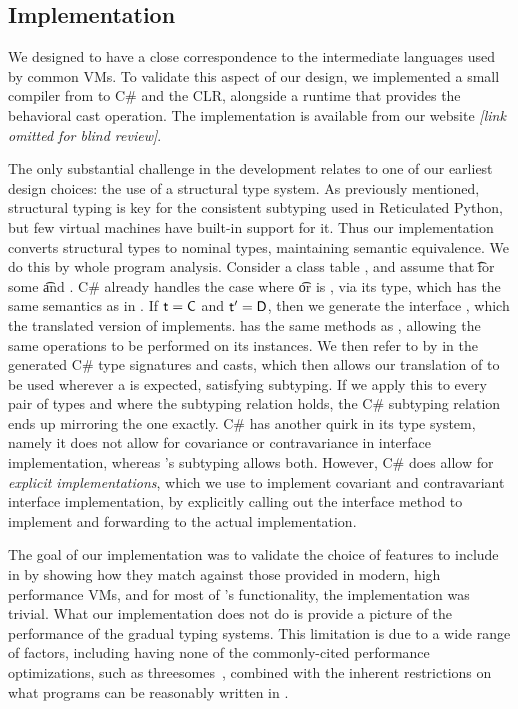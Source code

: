 \documentclass{tex/llncs}
\begin{document}
\subsection{Implementation}

We designed \kafka to have a close correspondence to the intermediate
languages used by common VMs. To validate this aspect of our design, we
implemented a small compiler from \kafka to C\# and the CLR, alongside a
runtime that provides the behavioral cast operation. The implementation is
available from our website \emph{[link omitted for blind review]}.

The only substantial challenge in the development relates to one of our earliest design
choices: the use of a structural type system. As previously mentioned,
structural typing is key for the consistent subtyping used in Reticulated
Python, but few virtual machines have built-in support for it. Thus our
implementation converts structural types to nominal types, maintaining
semantic equivalence.  We do this by whole program analysis. Consider a
class table \K, and assume that \StrSub{}\K\t\tp for some \t and \tp. C\#
already handles the case where \t or \tp is \any, via its  type,
which has the same semantics as \any in \kafka. If $\t=\C$ and $\tp=\D$,
then we generate the interface , which the translated version of \C
implements.  has the same methods as \D, allowing the same operations
to be performed on its instances. We then refer to \D by  in the
generated C\# type signatures and casts, which then allows our translation
of \C to be used wherever a \D is expected, satisfying subtyping. If we
apply this to every pair of types \C and \D where the subtyping relation
holds, the C\# subtyping relation ends up mirroring the \kafka one exactly.
C\# has another quirk in its type system, namely it does not allow for
covariance or contravariance in interface implementation, whereas \kafka's
subtyping allows both. However, C\# does allow for \emph{explicit
  implementations}, which we use to implement covariant and contravariant
interface implementation, by explicitly calling out the interface method to
implement and forwarding to the actual implementation.

The goal of our implementation was to validate the choice of features to
include in \kafka by showing how they match against those provided in modern, high
performance VMs, and for most of \kafka's functionality, the implementation
was trivial. What our implementation does not do is provide a picture of the
performance of the gradual typing systems. This limitation is due to a wide
range of factors, including having none of the commonly-cited performance
optimizations, such as threesomes~\cite{siek10}, combined with the inherent
restrictions on what programs can be reasonably written in \kafka.
\end{document}
